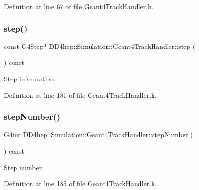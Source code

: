Definition at line 67 of file Geant4\+Track\+Handler.\+h.

\hypertarget{class_d_d4hep_1_1_simulation_1_1_geant4_track_handler_a5d49e7ad72048dbfcdfd209c88d6d252}{}\label{class_d_d4hep_1_1_simulation_1_1_geant4_track_handler_a5d49e7ad72048dbfcdfd209c88d6d252} 
\subsubsection{\texorpdfstring{step()}{step()}}
{\footnotesize\ttfamily const G4\+Step$\ast$ D\+D4hep\+::\+Simulation\+::\+Geant4\+Track\+Handler\+::step (\begin{DoxyParamCaption}{ }\end{DoxyParamCaption}) const\hspace{0.3cm}{\ttfamily [inline]}}



Step information. 



Definition at line 181 of file Geant4\+Track\+Handler.\+h.

\hypertarget{class_d_d4hep_1_1_simulation_1_1_geant4_track_handler_af3908966bb8fcc2549d7fa206d587758}{}\label{class_d_d4hep_1_1_simulation_1_1_geant4_track_handler_af3908966bb8fcc2549d7fa206d587758} 
\subsubsection{\texorpdfstring{step\+Number()}{stepNumber()}}
{\footnotesize\ttfamily G4int D\+D4hep\+::\+Simulation\+::\+Geant4\+Track\+Handler\+::step\+Number (\begin{DoxyParamCaption}{ }\end{DoxyParamCaption}) const\hspace{0.3cm}{\ttfamily [inline]}}



Step number. 



Definition at line 185 of file Geant4\+Track\+Handler.\+h.

